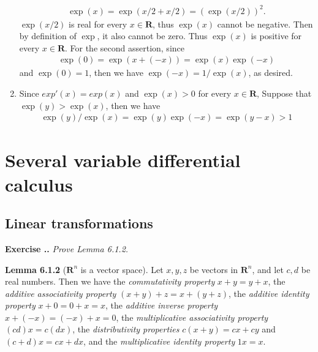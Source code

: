 \documentclass{book}
\newcommand{\titl}[1]{\noindent\textbf{#1}}
\newcounter{Exercise}[section]
\renewcommand{\theExercise}{\thesection.\arabic{Exercise}.}
\newcommand{\new}{\vspace{1.5em}\noindent\textbf{Exercise \stepcounter{Exercise}\textbf{\theExercise}} }
\begin{document}
\begin{enumerate}
        \begin{align*}
            \exp(x) = \exp(x/2 + x/2) = (\exp(x/2))^2.
        \end{align*}
    $\exp(x/2)$ is real for every $x \in \mathbf{R}$, thus $\exp(x)$ cannot be negative. Then by definition of $\exp$, it also cannot be zero. Thus $\exp(x)$ is positive for every $x \in \mathbf{R}$. For the second assertion, since
        \begin{align*}
            \exp(0) = \exp(x + (-x)) = \exp(x)\exp(-x)
        \end{align*}
    and $\exp(0) = 1$, then we have $\exp(-x) = 1/\exp(x)$, as desired.
    \item Since $exp'(x) = exp(x)$ and $\exp(x) > 0$ for every $x \in \mathbf{R}$, 
    Suppose that $\exp(y) > \exp(x)$, then we have
        \begin{align*}
            \exp(y)/\exp(x) = \exp(y)\exp(-x) = \exp(y - x) > 1
        \end{align*}
\end{enumerate}


\setcounter{chapter}{5}

\chapter{Several variable differential calculus}

\section{Linear transformations}

\new\emph{Prove Lemma 6.1.2.}

\begin{framed}
\titl{Lemma 6.1.2} ($\mathbf{R}^n$ is a vector space). Let $x,y,z$ be vectors in $\mathbf{R}^n$, and let $c,d$ be real numbers. Then we have the \emph{commutativity property} $x+y=y+x$, the \emph{additive associativity property} $(x+y)+z=x+(y+z)$, the \emph{additive identity property} $x+0=0+x=x$, the \emph{additive inverse property} $x+(-x)=(-x)+x=0$, the \emph{multiplicative associativity property} $(cd)x=c(dx)$, the \emph{distributivity properties} $c(x+y)=cx+cy$ and $(c+d)x=cx+dx$, and the \emph{multiplicative identity property} $1x=x$.
\end{framed}
\end{document}
